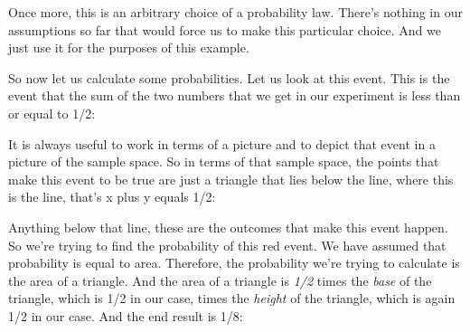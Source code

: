 \documentclass[pdftex, brazil, 12pt, twoside]{article}
\begin{document}
Once more, this is an arbitrary choice of a
probability law.
There's nothing in our assumptions so far that would
force us to make this particular choice.
And we just use it for the purposes of this example.

So now let us calculate some probabilities.
Let us look at this event.
This is the event that the sum of the two numbers that we get
in our experiment is less than or equal to 1/2:

\begin{figure}[H]
  \begin{center}
  \end{center}
\end{figure}

It is always useful to work in terms of a picture and to
depict that event in a picture of the sample space.
So in terms of that sample space, the points that make
this event to be true are just a triangle that lies below the
line, where this is the line, that's x plus y equals 1/2:

\begin{figure}[H]
  \begin{center}
  \end{center}
\end{figure}

Anything below that line, these are the outcomes that
make this event happen.
So we're trying to find the probability of this red event.
We have assumed that probability is equal to area.
Therefore, the probability we're trying to calculate is
the area of a triangle.
And the area of a triangle is \emph{1/2} times the \emph{base} of the
triangle, which is 1/2 in our case, times the \emph{height} of the
triangle, which is again 1/2 in our case.
And the end result is 1/8:
\end{document}

